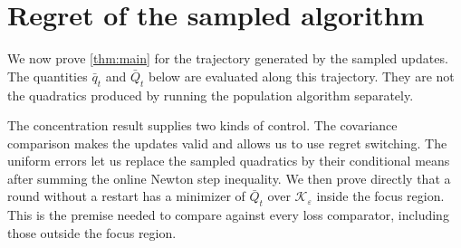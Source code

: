 \documentclass[12pt,cleveref]{jmlr}
\newcommand{\K}{\mathcal K}
\newcommand{\1}{\mathbf 1}
\newcommand{\eps}{\varepsilon}
\begin{document}
\section{Regret of the sampled algorithm}
\label{transfer:section}

We now prove \cref{thm:main} for the trajectory generated by the sampled
updates. The quantities $\bar q_t$ and $\bar Q_t$ below are evaluated
along this trajectory. They are not the quadratics produced by running
the population algorithm separately.

The concentration result supplies two kinds of control. The covariance
comparison makes the updates valid and allows us to use regret switching.
The uniform errors let us replace the sampled quadratics by their
conditional means after summing the online Newton step inequality.
We then prove directly that a round without a restart has a minimizer
of $\bar Q_t$ over $\K_\eps$ inside the focus region. This is the premise
needed to compare against every loss comparator, including those
outside the focus region.
\end{document}
